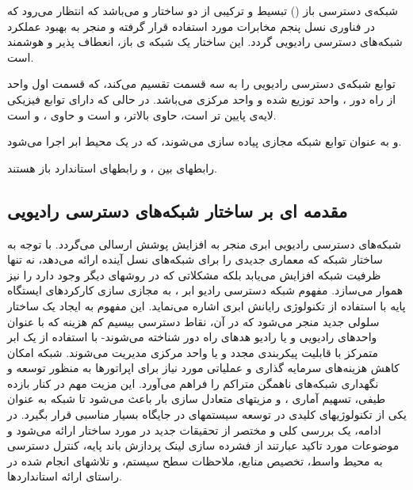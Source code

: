 شبکه‌ی دسترسی باز 
()
تبسیط و ترکیبی از دو ساختار   و  می‌باشد که انتظار می‌رود که در فناوری نسل پنجم مخابرات مورد استفاده قرار گرفته و منجر به بهبود عملکرد شبکه‌های دسترسی رادیویی  گردد. 
این ساختار یک شبکه ی باز، انعطاف پذیر و هوشمند است.


توابع
 شبکه‌ی دسترسی رادیویی 
 را به سه قسمت تقسیم می‌کند،
  که قسمت اول واحد از راه دور
   
، واحد توزیع شده
    
  و واحد مرکزی 
     
   می‌باشد.
   در حالی که  دارای توابع فیزیکی   لایه‌ی پایین تر است،
     حاوی  بالاتر، 
    و
      است     
    و 
     حاوی
     ،
      و 
      است.
      
و
به عنوان توابع شبکه مجازی  پیاده سازی می‌شوند،
که در یک محیط ابر اجرا می‌شود.

رابطهای بین ،  و  رابطهای استاندارد باز هستند.
\subsection{مقدمه ای بر ساختار شبکه‌های دسترسی رادیویی }
شبکه‌های دسترسی رادیویی‌ ابری منجر به افزایش پوشش ارسالی می‌گردد. با توجه به ساختار شبکه
    که معماری جدیدی را برای شبکه‌های نسل آینده
ارائه می‌دهد، نه تنها ظرفیت شبکه افزایش می‌یابد بلکه
مشکلاتی که در روشهای دیگر وجود دارد را نیز هموار
می‌سازد.
مفهوم شبکه دسترسی رادیو ابر ، به مجازی سازی کارکردهای ایستگاه  پایه  با استفاده از تکنولوژی رایانش ابری  اشاره می‌نماید. این مفهوم به ایجاد یک ساختار سلولی جدید منجر می‌شود که در آن، نقاط دسترسی بیسیم کم هزینه که با عنوان واحدهای رادیویی  و یا رادیو هدهای
  راه دور 
 شناخته می‌شوند- با استفاده از یک ابر متمرکز با قابلیت پیکربندی مجدد و یا واحد مرکزی  مدیریت می‌شوند. شبکه امکان کاهش هزینه‌های سرمایه گذاری و عملیاتی مورد نیاز برای اپراتورها به منظور توسعه و نگهداری شبکه‌های ناهمگن متراکم را فراهم می‌آورد. این مزیت مهم در کنار بازده طیفی، تسهیم آماری ، و مزیتهای متعادل سازی بار باعث می‌شود تا شبکه  به عنوان یکی از تکنولوژیهای کلیدی در توسعه سیستمهای  در جایگاه بسیار مناسبی قرار بگیرد. در ادامه، یک بررسی کلی و مختصر از تحقیقات جدید در مورد ساختار  ارائه می‌شود و موضوعات مورد تاکید عبارتند از فشرده سازی لینک  پردازش باند پایه، کنترل دسترسی به محیط واسط، تخصیص منابع، ملاحظات سطح سیستم، و تلاشهای انجام شده در راستای ارائه استانداردها.
